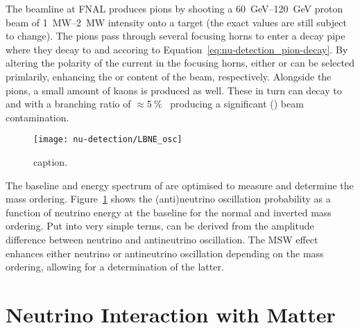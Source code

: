 The beamline at FNAL produces pions by shooting a \SIrange{60}{120}{\giga\electronvolt} proton beam of \SIrange{1}{2}{\mega\watt} intensity onto a target (the exact values are still subject to change).
The pions pass through several focusing horns to enter a decay pipe where they decay to \Pgm and \Pgngm accoring to Equation~\eqref{eq:nu-detection_pion-decay}.
By altering the polarity of the current in the focusing horns, either \Pgpp or \Pgpm can be selected primlarily, enhancing the \Pgngm or \Pagngm content of the beam, respectively.
Alongside the pions, a small amount of kaons is produced as well.
These in turn can decay to \Pgne and \Pagne with a branching ratio of $\approx\SI{5}{\percent}$~\cite{pdg} producing a significant \Pgne (\Pagne) beam contamination.

\begin{figure}[htb]
	\centering
	\texttt{[image: nu-detection/LBNE\_osc]}
	\caption{caption.~\cite{qianVogel}}
	\label{fig:nu-detection_dune-osc}
\end{figure}

The baseline and energy spectrum of \dune{} are optimised to measure \dcp{} and determine the mass ordering.
Figure~\ref{fig:nu-detection_dune-osc} shows the (anti)neutrino oscillation probability as a function of neutrino energy at the \dune{} baseline for the normal and inverted mass ordering.
Put into very simple terms, \dcp{} can be derived from the amplitude difference between neutrino and antineutrino oscillation.
The MSW effect enhances either neutrino or antineutrino oscillation depending on the mass ordering, allowing for a determination of the latter.


\section{Neutrino Interaction with Matter}
\label{sec:nu-detection_interactions}


